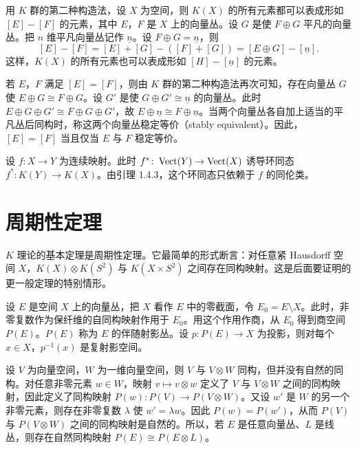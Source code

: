 用 $K$ 群的第二种构造法，设 $X$ 为空间，则 $K(X)$ 的所有元素都可以表成形如 $[E]-[F]$ 的元素，其中 $E$，$F$ 是 $X$ 上的向量丛。设 $G$ 是使 $F\oplus G$ 平凡的向量丛。把 $n$ 维平凡向量丛记作 $\underline{n}$。设 $F\oplus G=\underline{n}$，则
\[
[E]-[F]=[E]+[G]-([F]+[G])=[E\oplus G]-[\underline{n}].
\]
这样，$K(X)$ 的所有元素也可以表成形如 $[H]-[\underline{n}]$ 的元素。

若 $E$，$F$ 满足 $[E]=[F]$，则由 $K$ 群的第二种构造法再次可知，存在向量丛 $G$ 使 $E\oplus G\cong F\oplus G$。设 $G'$ 是使 $G\oplus G'\cong\underline{n}$ 的向量丛。此时 $E\oplus G\oplus G'\cong F\oplus G\oplus G'$，故 $E\oplus\underline{n}\cong F\oplus\underline{n}$。当两个向量丛各自加上适当的平凡丛后同构时，称这两个向量丛稳定等价（stably equivalent）。因此，$[E]=[F]$ 当且仅当 $E$ 与 $F$ 稳定等价。

设 $f\colon X\to Y$ 为连续映射。此时 $f^{*}\colon\operatorname{Vect}(Y)\to\operatorname{Vect}(X)$ 诱导环同态 $f^{*}\colon K(Y)\to K(X)$。由引理 1.4.3，这个环同态只依赖于 $f$ 的同伦类。

\section{周期性定理}

$K$ 理论的基本定理是周期性定理。它最简单的形式断言：对任意紧 Hausdorff 空间 $X$，$K(X)\otimes K(S^2)$ 与 $K(X\times S^2)$ 之间存在同构映射。这是后面要证明的更一般定理的特别情形。

设 $E$ 是空间 $X$ 上的向量丛，把 $X$ 看作 $E$ 中的零截面，令 $E_0=E\setminus X$。此时，非零复数作为保纤维的自同构映射作用于 $E_0$。用这个作用作商，从 $E_0$ 得到商空间 $P(E)$。$P(E)$ 称为 $E$ 的伴随射影丛。设 $p\colon P(E)\to X$ 为投影，则对每个 $x\in X$，$p^{-1}(x)$ 是复射影空间。

设 $V$ 为向量空间，$W$ 为一维向量空间，则 $V$ 与 $V\otimes W$ 同构，但并没有自然的同构。对任意非零元素 $w\in W$，映射 $v\mapsto v\otimes w$ 定义了 $V$ 与 $V\otimes W$ 之间的同构映射，因此定义了同构映射 $P(w)\colon P(V)\to P(V\otimes W)$。又设 $w'$ 是 $W$ 的另一个非零元素，则存在非零复数 $\lambda$ 使 $w'=\lambda w$。因此 $P(w)=P(w')$，从而 $P(V)$ 与 $P(V\otimes W)$ 之间的同构映射是自然的。所以，若 $E$ 是任意向量丛、$L$ 是线丛，则存在自然同构映射 $P(E)\cong P(E\otimes L)$。

